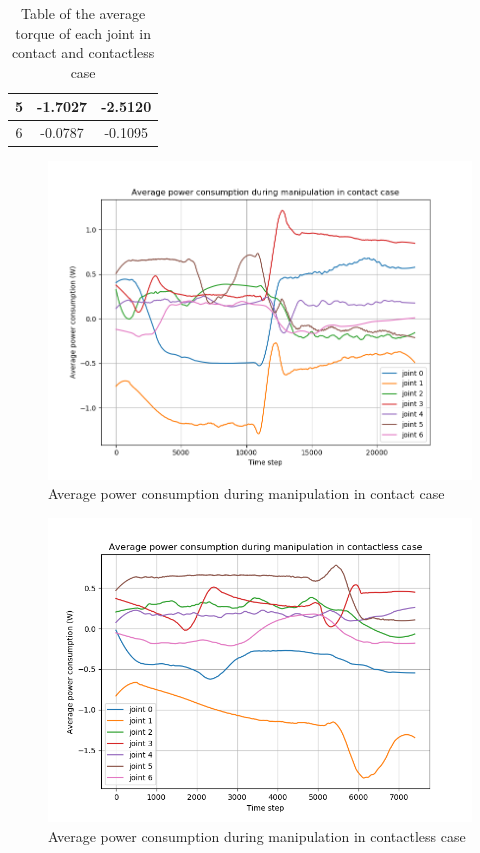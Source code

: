 \documentclass[report.tex]{subfiles}
\begin{document}
\begin{table}[H]
\begin{tabular}{c|c|c|}
    \multicolumn{1}{|c|}{5}     & -1.7027                                                      & -2.5120                                                      \\ \hline
    \multicolumn{1}{|c|}{6}     & -0.0787                                                      & -0.1095                                                      \\ \hline
    \end{tabular}%
    \caption{Table of the average torque of each joint in contact and contactless case}
    \label{tab:us1_table_torque}
    \end{table}
    
    \begin{figure}[H]
        \centering
        \includegraphics[width=\textwidth]{images/us1_con_pow.png}
        \caption{Average power consumption during manipulation in contact case}
        \label{fig:us1_pow_plot_con}
    \end{figure}
    \begin{figure}[H]
        \centering
        \includegraphics[width=\textwidth]{images/us1_conless_pow.png}
        \caption{Average power consumption during manipulation in contactless case}
        \label{fig:us1_pow_plot_nocon}
    \end{figure}
\end{document}
